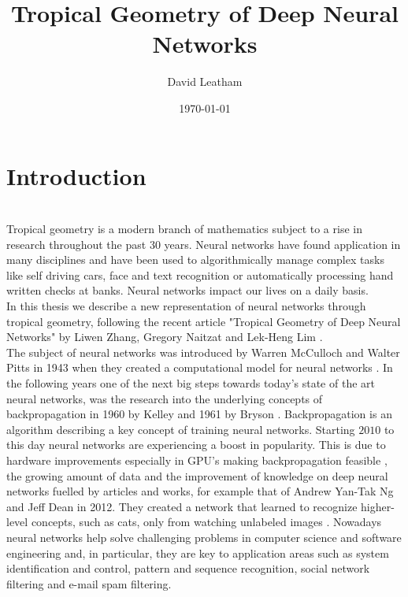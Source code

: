 \documentclass{article}
\title{Tropical Geometry of Deep Neural Networks}
\author{David Leatham}
\date{\today}
\theoremstyle{definition}
\begin{document}


\newpage
  
\tableofcontents

\newpage


\section{Introduction} 
\leavevmode
\\
Tropical geometry is a modern branch of mathematics subject to a rise in research throughout the past 30 years. Neural networks have found application in many disciplines and have been used to algorithmically manage complex tasks like self driving cars, face and text recognition or automatically processing hand written checks at banks. Neural networks impact our lives on a daily basis. \\
In this thesis we describe a new representation of neural networks through tropical geometry, following the recent article "Tropical Geometry of Deep Neural Networks" by Liwen Zhang, Gregory Naitzat and Lek-Heng Lim \cite{maclagan2015introduction}. \\

The subject of neural networks was introduced by Warren McCulloch and Walter Pitts in 1943 when they created a computational model for neural networks \cite{mcculloch1943logical}. In the following years one of the next big steps towards today's state of the art neural networks, was the research into the underlying concepts of backpropagation in 1960 by Kelley \cite{kelley1960gradient} and 1961 by Bryson \cite{bryson1961gradient}. Backpropagation is an algorithm describing a key concept of training neural networks. Starting $2010$ to this day neural networks are experiencing a boost in popularity. This is due to hardware improvements especially in GPU's making backpropagation feasible \cite{cirecsan2010deep}, the growing amount of data and the improvement of knowledge on deep neural networks fuelled by articles and works, for example that of Andrew Yan-Tak Ng and Jeff Dean in 2012. They created a network that learned to recognize higher-level concepts, such as cats, only from watching unlabeled images \cite{DBLP:journals/corr/abs-1112-6209}. Nowadays neural networks help solve challenging problems in computer science and software engineering and, in particular, they are key to application areas such as system identification and control, pattern and sequence recognition, social network filtering and e-mail spam filtering. \\
\end{document}
